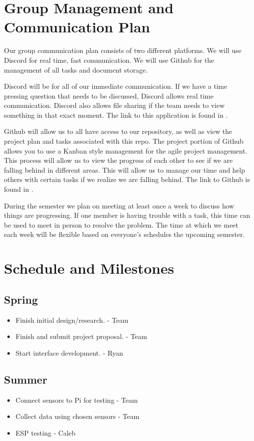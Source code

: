\documentclass[letterpaper, 10 pt, conference]{ieeeconf}  %
\begin{document}
\section{Group Management and Communication Plan}
Our group communication plan consists of two different platforms. We will use Discord for real time, fast communication. We will use Github for the management of all tasks and document storage. 

Discord will be for all of our immediate communication. If we have a time pressing question that needs to be discussed, Discord allows real time communication. Discord also allows file sharing if the team needs to view something in that exact moment. The link to this application is found in \cite{discord}.

Github will allow us to all have access to our repository, as well as view the project plan and tasks associated with this repo. The project portion of Github allows you to use a Kanban style management for the agile project management. This process will allow us to view the progress of each other to see if we are falling behind in different areas. This will allow us to manage our time and help others with certain tasks if we realize we are falling behind. The link to Github is found in \cite{github}. 

During the semester we plan on meeting at least once a week to discuss how things are progressing. If one member is having trouble with a task, this time can be used to meet in person to resolve the problem. The time at which we meet each week will be flexible based on everyone's schedules the upcoming semester.

\section{Schedule and Milestones}
\subsection{Spring}
\begin{itemize}
    \item Finish initial design/research. - Team
    \item Finish and submit project proposal. - Team
    \item Start interface development. - Ryan
\end{itemize}

\subsection{Summer}
\begin{itemize}
    \item Connect sensors to Pi for testing - Team
    \item Collect data using chosen sensors - Team
    \item ESP testing - Caleb
\end{itemize}
\end{document}
